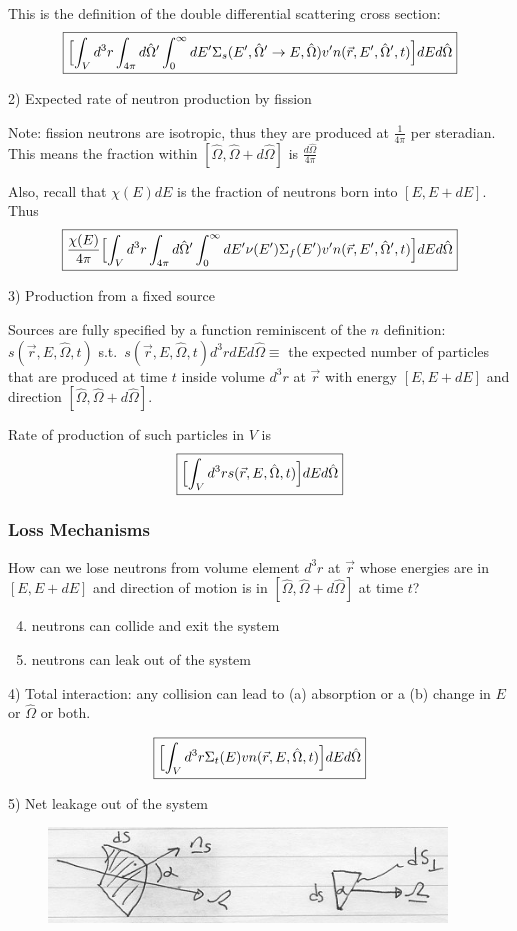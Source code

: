\documentclass[12pt]{article}
\newcommand{\vOmega}{\ensuremath{\hat{\Omega}}}
\begin{document}
This is the definition of the double differential scattering cross section:
\[\boxed{\Bigl[\int_V d^3r \int_{4\pi} d\vOmega' \int_0^{\infty} dE' \Sigma_s(E', \vOmega' \rightarrow E, \vOmega) v' n(\vec{r}, E', \vOmega', t) \Bigr] dE d\vOmega}\]

2) Expected rate of neutron production by fission

Note: fission neutrons are isotropic, thus they are produced at $\frac{1}{4\pi}$ per steradian. This means the fraction within $[\vOmega, \vOmega + d\vOmega]$ is $\frac{d\vOmega}{4\pi}$

Also, recall that $\chi(E)dE$ is the fraction of neutrons born into $[E, E + dE]$. Thus
%
\[\boxed{\frac{\chi(E)}{4\pi}\Bigl[\int_V d^3r \int_{4\pi} d\vOmega' \int_0^{\infty} dE' \nu(E') \Sigma_f(E') v' n(\vec{r}, E', \vOmega', t) \Bigr] dE d\vOmega}\]

3) Production from a fixed source

Sources are fully specified by a function reminiscent of the $n$ definition: $s(\vec{r}, E, \vOmega, t)$ s.t.\ $s(\vec{r}, E, \vOmega, t)d^3rdEd\vOmega \equiv$ the expected number of particles that are produced at time $t$ inside volume $d^3r$ at $\vec{r}$ with energy $[E, E + dE]$ and direction $[\vOmega, \vOmega + d\vOmega]$.

Rate of production of such particles in $V$ is
\[\boxed{\Bigl[\int_V d^3r s(\vec{r}, E, \vOmega, t) \Bigr] dE d\vOmega }\]

\subsubsection{Loss Mechanisms}
How can we lose neutrons from volume element $d^3r$ at $\vec{r}$ whose energies are in $[E, E + dE]$ and direction of motion is in $[\vOmega, \vOmega + d\vOmega]$ at time $t$?
%
\begin{enumerate}
\setcounter{enumi}{3}
\item neutrons can collide and exit the system
\item neutrons can leak out of the system
\end{enumerate}

4) Total interaction: any collision can lead to (a) absorption or a (b) change in $E$ or $\vOmega$ or both.

\[\boxed{\Bigl[\int_V d^3r \Sigma_t(E) v n(\vec{r}, E, \vOmega, t) \Bigr] dE d\vOmega }\]

5) Net leakage out of the system

\begin{figure}[h!]
\begin{center}
\includegraphics[height=1in]{DifferentialArea}
\end{center}
\end{figure}
\end{document}
